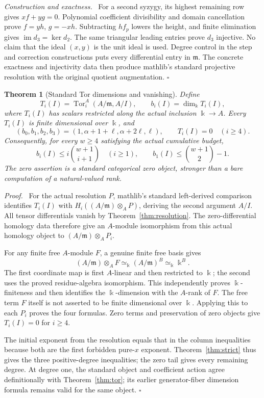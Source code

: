 \documentclass[11pt,a4paper]{article}
\newtheorem{theorem}{Theorem}[section]
\newenvironment{proof}[1][Proof]{\par\noindent\textit{#1.}\ \ignorespaces}{\unskip\nobreak\hfill\ensuremath{\square}\par}
\newcommand{\kk}{\Bbbk}
\begin{document}
\begin{proof}[Construction and exactness]
For a second syzygy, its highest remaining row gives $xf+yg=0$.
Polynomial coefficient divisibility and domain cancellation prove
$f=yh$, $g=-xh$. Subtracting $h f_p$ lowers the height, and finite
elimination gives $\operatorname{im}d_3=\ker d_2$. The same triangular
leading entries prove $d_3$ injective. No claim that the ideal $(x,y)$
is the unit ideal is used. Degree control in the step and correction
constructions puts every differential entry in $\mathfrak m$.
The concrete exactness and injectivity data then produce mathlib's
standard projective resolution with the original quotient augmentation.
\end{proof}

\begin{theorem}[Standard Tor dimensions and vanishing]\label{thm:higher}
Define
\[
 T_i(I)=\operatorname{Tor}_i^A(A/\mathfrak m,A/I),
 \qquad b_i(I)=\dim_{\kk}T_i(I),
\]
where $T_i(I)$ has scalars restricted along the actual inclusion $\kk\to A$.
Every $T_i(I)$ is finite dimensional over $\kk$, and
\[
 (b_0,b_1,b_2,b_3)=(1,\alpha+1+\ell,\alpha+2\ell,\ell),
 \qquad T_i(I)=0\quad(i\ge4).
\]
Consequently, for every $w\ge4$ satisfying the actual cumulative budget,
\[
 b_i(I)\le i\binom{w+1}{i+1}\quad(i\ge1),\qquad
 b_1(I)\le\binom{w+1}{2}-1.
\]
The zero assertion is a standard categorical zero object, stronger than a
bare computation of a natural-valued rank.
\end{theorem}
\begin{proof}
For the actual resolution $P$, mathlib's standard left-derived comparison
identifies $T_i(I)$ with $H_i((A/\mathfrak m)\otimes_A P)$, deriving the
second argument $A/I$. All tensor differentials vanish by
Theorem~\ref{thm:resolution}. The zero-differential homology data therefore
give an $A$-module isomorphism from this actual homology object to
$(A/\mathfrak m)\otimes_A P_i$.

For any finite free $A$-module $F$, a genuine finite free basis gives
\[
 (A/\mathfrak m)\otimes_A F
 \simeq_{\kk}(A/\mathfrak m)^{B}\simeq_{\kk}\kk^{B}.
\]
The first coordinate map is first $A$-linear and then restricted to $\kk$;
the second uses the proved residue-algebra isomorphism. This independently
proves $\kk$-finiteness and then identifies the $\kk$-dimension with the
$A$-rank of $F$. The free term $F$ itself is not asserted to be
finite dimensional over $\kk$. Applying this to each $P_i$ proves the four
formulas. Zero terms and preservation of zero objects give $T_i(I)=0$
for $i\ge4$.

The initial exponent from the resolution equals that in the column
inequalities because both are the first forbidden pure-$x$ exponent.
Theorem~\ref{thm:strict} thus gives the three positive-degree inequalities;
the zero tail gives every remaining degree. At degree one, the standard
object and coefficient action agree definitionally with
Theorem~\ref{thm:tor}; its earlier generator-fiber dimension formula remains
valid for the same object.
\end{proof}
\end{document}
